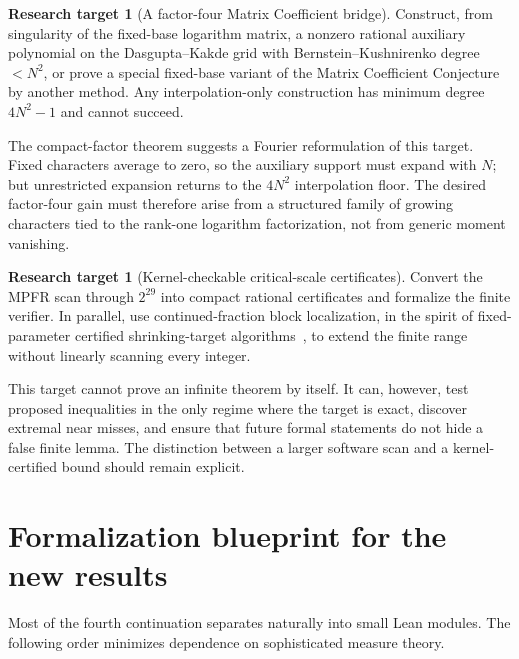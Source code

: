 \documentclass[11pt,oneside]{article}
\theoremstyle{definition}
\newtheorem{target}[theorem]{Research target}
\theoremstyle{remark}
\begin{document}
\begin{target}[A factor-four Matrix Coefficient bridge]
\label{mt:target-factor-four}
Construct, from singularity of the fixed-base logarithm matrix, a nonzero rational auxiliary
polynomial on the Dasgupta--Kakde grid with Bernstein--Kushnirenko degree $<N^2$, or prove a
special fixed-base variant of the Matrix Coefficient Conjecture by another method.  Any
interpolation-only construction has minimum degree $4N^2-1$ and cannot succeed.
\end{target}

The compact-factor theorem suggests a Fourier reformulation of this target.  Fixed characters
average to zero, so the auxiliary support must expand with $N$; but unrestricted expansion
returns to the $4N^2$ interpolation floor.  The desired factor-four gain must therefore arise
from a structured family of growing characters tied to the rank-one logarithm factorization,
not from generic moment vanishing.

\begin{target}[Kernel-checkable critical-scale certificates]
\label{mt:target-certificates}
Convert the MPFR scan through $2^{29}$ into compact rational certificates and formalize the
finite verifier.  In parallel, use continued-fraction block localization, in the spirit of
fixed-parameter certified shrinking-target algorithms~\cite{Fang2026}, to extend the finite
range without linearly scanning every integer.
\end{target}

This target cannot prove an infinite theorem by itself.  It can, however, test proposed
inequalities in the only regime where the target is exact, discover extremal near misses, and
ensure that future formal statements do not hide a false finite lemma.  The distinction
between a larger software scan and a kernel-certified bound should remain explicit.

\section{Formalization blueprint for the new results}
\label{mt:sec-formalization-blueprint}

Most of the fourth continuation separates naturally into small Lean modules.  The following
order minimizes dependence on sophisticated measure theory.
\end{document}
